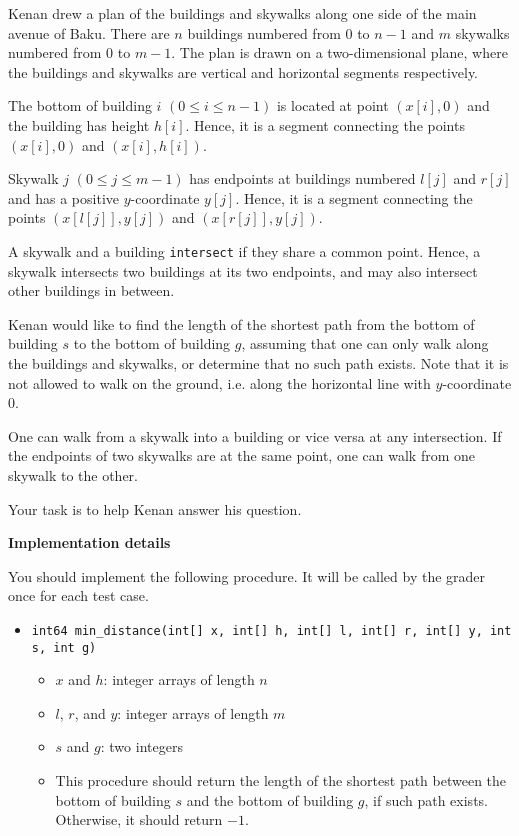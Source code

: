Kenan drew a plan of the buildings and skywalks along one side of the main avenue of Baku.
There are $n$ buildings numbered from $0$ to $n-1$ and $m$ skywalks numbered from $0$ to $m-1$.
The plan is drawn on a two-dimensional plane, where the buildings and skywalks are vertical and horizontal segments respectively.

The bottom of building $i$ $(0 \leq i \leq n-1)$ is located at point $(x[i], 0)$ and the building has height $h[i]$. Hence, it is a segment connecting the points $(x[i], 0)$ and $(x[i], h[i])$.

Skywalk $j$ $(0 \leq j \leq m-1)$ has endpoints at buildings numbered $l[j]$ and $r[j]$ and has a positive $y$-coordinate
$y[j]$. Hence, it is a segment connecting the points $(x[l[j]], y[j])$ and $(x[r[j]], y[j])$.

A skywalk and a building \texttt{intersect} if they share a common point.
Hence, a skywalk intersects two buildings at its two endpoints, and may also intersect other buildings in between.

Kenan would like to find the length of the shortest path from the bottom of building $s$ to the bottom of building $g$, assuming that one can only walk along the buildings and skywalks, or determine that no such path exists. Note that it is not allowed to walk on the ground, i.e. along the horizontal line with $y$-coordinate $0$.

One can walk from a skywalk into a building or vice versa at any intersection.
If the endpoints of two skywalks are at the same point, one can walk from one skywalk to the other.

Your task is to help Kenan answer his question.

\textbf{Implementation details}

You should implement the following procedure. It will be called by the grader once for each test case.

\begin{itemize}
\item \texttt{int64 min\_distance(int[] x, int[] h, int[] l, int[] r, int[] y,
                   int s, int g)}
\begin{itemize}
\item $x$ and $h$: integer arrays of length $n$
\item $l$, $r$, and $y$: integer arrays of length $m$
\item $s$ and $g$: two integers
\item This procedure should return the length of the shortest path between the bottom of building $s$ and the bottom of building $g$, if such path exists. Otherwise, it should return $-1$.
\end{itemize}
\end{itemize}





